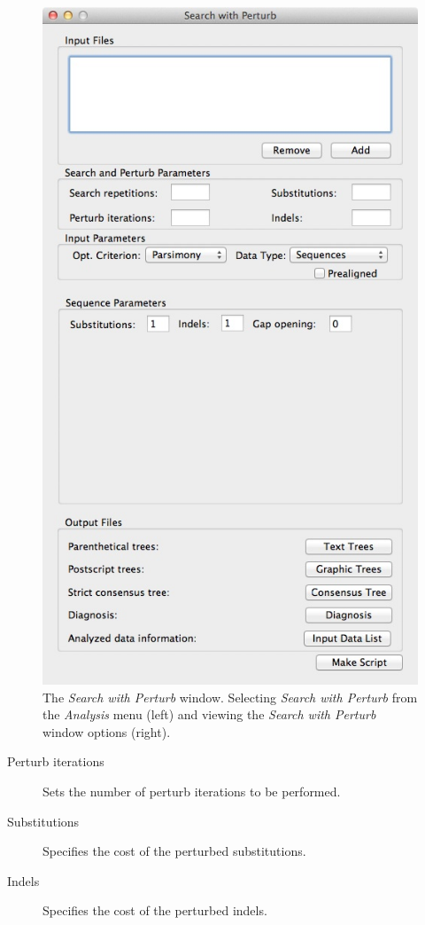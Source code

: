 {\begin{figure}
\begin{minipage}[c]{0.52\textwidth}
\includegraphics[width=\textwidth]{doc/figures/searchwithperturb_window.jpg}
\end{minipage} 
\caption{The \emph{Search with Perturb} window. Selecting \emph{Search with Perturb} from the \emph{Analysis} 
menu (left) and viewing the \emph{Search with Perturb} window options (right).}
\label{fig:search_with_perturb_window}
\end{figure}

\begin{description}
\item[Perturb iterations] Sets the number of perturb iterations to be performed.
\item[Substitutions] Specifies the cost of the perturbed substitutions.
\item[Indels] Specifies the cost of the perturbed indels.
\end{description}

}
